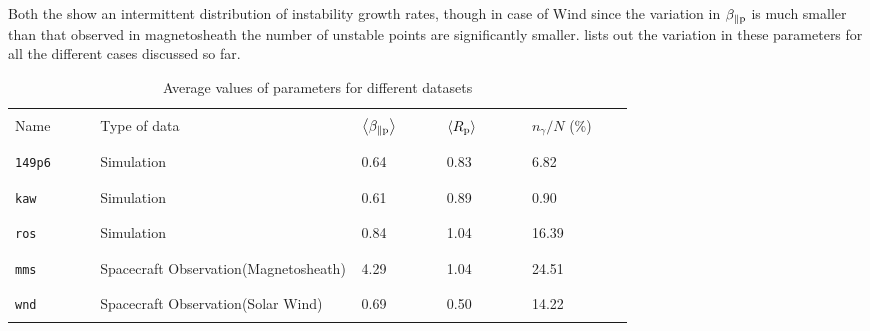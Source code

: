             Both the  show an intermittent distribution of instability
            growth rates, though in case of Wind since the variation in $\beta_{\parallel \rm p}$ is
            much smaller than that observed in magnetosheath the number of unstable points are
            significantly smaller.  lists out the variation in these
            parameters for all the different cases discussed so far.

            \begin{table}[ht]
                \centering
                \caption[Average value of parameters for datasets]{Average values of parameters for
                different datasets}
                \begin{tabular}{ p{0.1\linewidth} p{0.30\linewidth} p{0.1\linewidth}
                p{0.1\linewidth} p{0.12\linewidth}}
                    \hline
                    \\
                    Name & Type of data & $\left<\beta_{\parallel \rm p}\right>$ & $\left<R_{\rm
                    p}\right>$ & $n_\gamma/N$ (\%)\\
                    \\
                    \hline
                    \\
                    \texttt{149p6} & Simulation & 0.64 & 0.83 & 6.82 \\
                    \\
                    \hline
                    \\
                    \texttt{kaw} & Simulation & 0.61 & 0.89 & 0.90 \\
                    \\
                    \hline
                    \\
                    \texttt{ros} & Simulation & 0.84 & 1.04 & 16.39 \\
                    \\
                    \hline
                    \\
                    \texttt{mms} & Spacecraft \newline Observation\newline (Magnetosheath) & 4.29 &
                    1.04 & 24.51 \\
                    \\
                    \hline
                    \\
                    \texttt{wnd} & Spacecraft \newline Observation\newline (Solar Wind) & 0.69 &
                    0.50 & 14.22 \\
                    \\
                    \hline
                \end{tabular}
                \label{tab:datadetail4a}
            \end{table}

